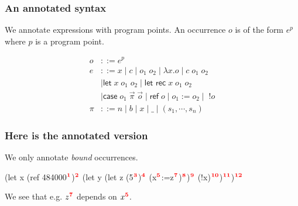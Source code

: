 \documentclass{beamer}
\begin{document}
\begin{frame}
  \frametitle{An annotated syntax}

  We annotate expressions with program points. An occurrence $o$ is of the form $e^p$ where $p$ is a program point.
  
\begin{align*}
o &::= e^p \\
e &::= x \mid c \mid o_1\;o_2 \mid \lambda x.o \mid c \; o_1 \; o_2\\
			& \mid \textsf{let} \; x \; o_1 \; o_2 \mid
                   \textsf{let rec} \; x \; o_1 \; o_2 \\
  & \mid \textsf{case}
                   \; o_1 \; \vec{\pi} \; \vec{o} \mid  \textsf{ref} \; o \mid o_1 := o_2 \mid \; !o\\
\pi &::= n \mid b \mid x \mid \_  \mid
                                (s_1,\cdots,s_n)
\end{align*}

\end{frame}
\begin{frame}[fragile]
  \frametitle{Here is the annotated version}

    We only annotate \emph{bound} occurrences.

  \begin{rescript}
   (let x (ref 484000$\mathbf{\textcolor{red}{^{1}}}$)$\mathbf{\textcolor{red}{^{2}}}$
     (let y (let z (5$\mathbf{\textcolor{red}{^{3}}}$)$\mathbf{\textcolor{red}{^{4}}}$
        (x$\mathbf{\textcolor{red}{^{5}}}$:=z$\mathbf{\textcolor{red}{^{7}}}$)$\mathbf{\textcolor{red}{^{8}}}$)$\mathbf{\textcolor{red}{^{9}}}$ (!x)$\mathbf{\textcolor{red}{^{10}}}$)$\mathbf{\textcolor{red}{^{11}}}$)$\mathbf{\textcolor{red}{^{12}}}$
\end{rescript}

We see that e.g. $z\mathbf{\textcolor{red}{^{7}}}$ depends on $x\mathbf{\textcolor{red}{^{5}}}$.

\end{frame}

  \newcommand{\desc}[2]{\ensuremath{\underbrace{#1}_{\text{\tiny{#2}}}}}
\end{document}
